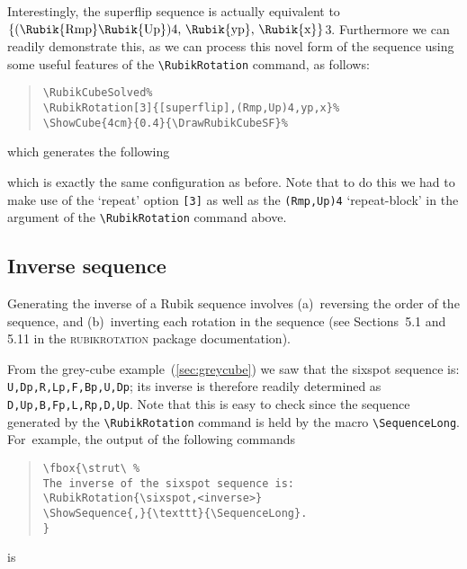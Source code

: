 \documentclass[a4paper]{article}
\newcommand{\Rubikbracket}[1]{$\left(\mbox{#1}\right)$}
\newcommand{\Rubikbrace}[1]{$\left\{\mbox{#1}\right\}$}
\begin{document}
Interestingly,  the superflip sequence is actually equivalent to
\Rubikbrace{\Rubikbracket{\Rubik{Rmp}\Rubik{Up}}4, \Rubik{yp}, \Rubik{x}}3.
Furthermore we can readily demonstrate this, as we can process this novel form 
of the sequence using  some useful features of the \verb!\RubikRotation! 
command, as follows:

\begin{quote}
\begin{verbatim}
\RubikCubeSolved%
\RubikRotation[3]{[superflip],(Rmp,Up)4,yp,x}%
\ShowCube{4cm}{0.4}{\DrawRubikCubeSF}%
\end{verbatim}
\end{quote}
which generates the following 

\begin{figure}[hbt]
  \centering
  \RubikCubeSolved%
\end{figure}
{\noindent}which is exactly the same configuration as before.
Note that to do this we had to make  use of  the `repeat'  option \verb![3]!  
as well as  the \verb!(Rmp,Up)4! `repeat-block' in 
the argument of  the \verb!\RubikRotation! command above. 




\pagebreak
\subsection{Inverse sequence}


Generating the inverse of a Rubik sequence involves (a)~reversing the order of 
the sequence, and (b)~inverting each rotation in the sequence 
(see Sections~5.1 and 5.11 in the \textsc{rubikrotation} package documentation).


From  the grey-cube example~(\ref{sec:greycube}) we saw that the sixspot sequence  is: \verb!U,Dp,R,Lp,F,Bp,U,Dp!;
its inverse is therefore readily determined as \verb!D,Up,B,Fp,L,Rp,D,Up!. 
Note that this is easy to check since the sequence generated by the  
\verb!\RubikRotation! command is held by the macro \verb!\SequenceLong!. 
For~example, the output of the following commands
\begin{quote}
\begin{verbatim}
\fbox{\strut\ %
The inverse of the sixspot sequence is:
\RubikRotation{\sixspot,<inverse>}
\ShowSequence{,}{\texttt}{\SequenceLong}.
}
\end{verbatim}
\end{quote}
is \quad{}
\end{document}
